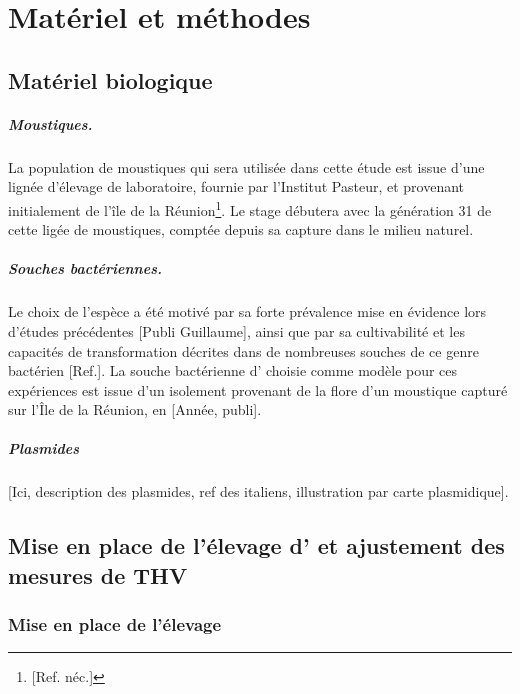 \chapter{Matériel et méthodes}

\section{Matériel biologique}

\paragraph{Moustiques.}
\label{par:moustiques}
La population de moustiques  qui sera utilisée dans cette étude est issue d'une lignée d'élevage de laboratoire, fournie par l'Institut Pasteur, et provenant initialement de l'île de la Réunion\footnote{[Ref. néc.]}.
Le stage débutera avec la génération 31 de cette ligée de moustiques, comptée depuis sa capture dans le milieu naturel.

\paragraph{Souches bactériennes.}
Le choix de l'espèce  a été motivé par sa forte prévalence mise en évidence lors d'études précédentes [Publi Guillaume], ainsi que par sa cultivabilité et les capacités de transformation décrites dans de nombreuses souches de ce genre bactérien [Ref.].
La souche bactérienne d' choisie comme modèle pour ces expériences est issue d'un isolement provenant de la flore d'un moustique capturé sur l'Île de la Réunion, en [Année, publi].

\paragraph{Plasmides}
[Ici, description des plasmides, ref des italiens, illustration par carte plasmidique].

\section{Mise en place de l'élevage d' et ajustement des mesures de THV}

\subsection{Mise en place de l'élevage}

